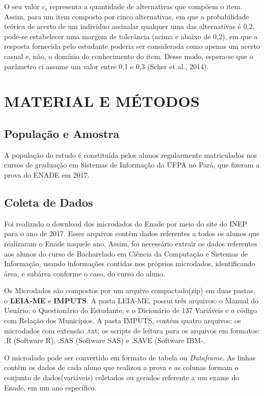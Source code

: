 \documentclass[12pt]{article}
\begin{document}
O seu valor $c_{i}$  representa a quantidade de alternativas que compõem o item. Assim, para um item composto por cinco alternativas, em que a probabilidade teórica de acerto de um indivíduo assinalar qualquer uma das alternativas é 0,2, pode-se estabelecer uma margem de tolerância (acima e abaixo de 0,2), em que a resposta fornecida pelo estudante poderia ser considerada como apenas um acerto casual e, não, o domínio do conhecimento do item. Desse modo, espera-se que o parâmetro ci assume um valor entre 0,1 e 0,3 (Scher et al., 2014).




\section{MATERIAL E MÉTODOS}

\subsection{População e Amostra}
\label{sec:metmodal}

A população do estudo é constituída pelos alunos regularmente matriculados nos cursos de graduação em Sistemas de Informação da UFPA no Pará, que fizeram a prova do ENADE em 2017.\vskip0.3cm


\subsection{Coleta de Dados}

Foi realizado o download dos microdados do Enade por meio do site do INEP
para o ano de 2017. Esses arquivos contêm dados referentes a todos os alunos que realizaram o Enade naquele ano. Assim, foi necessário extrair os dados referentes aos alunos do curso de Bacharelado em Ciência da Computação e Sistemas de Informação, usando informações contidas nos próprios microdados, identificando área, e subárea conforme o caso, do curso do aluno. 

Os Microdados são compostos por um arquivo compactado(zip) em duas pastas, o \textbf{LEIA-ME} e \textbf{IMPUTS}. A pasta LEIA-ME, possui três arquivos: o Manual do Usuário; o Questionário do Estudante, e o Dicionário de 137 Variáveis e o código com Relação dos Municípios. A pasta IMPUTS, contém quatro arquivos: os microdados com extensão .txt; os scripts de leitura para os arquivos em formatos: .R (Software R), .SAS (Software SAS) e .SAVE (Software IBM-.

O microdado pode ser convertido em formato de tabela ou \textit{Dataframe}. As linhas contêm os dados de cada aluno que realizou a prova e as colunas formam o conjunto de dados(variáveis) coletados ou gerados referente a um exame do Enade, em um ano específico.
\end{document}
